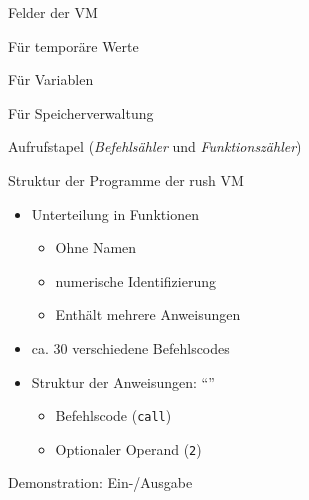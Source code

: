 \begin{frame}{Felder der VM}
	\begin{description}
		\item<1->[stack] Für temporäre Werte
		\item<2->[mem] Für Variablen
		\item<2->[mem\_ptr] Für Speicherverwaltung
		\item<3->[call\_stack] Aufrufstapel (\emph{Befehlsähler} und \emph{Funktionszähler})
	\end{description}
\end{frame}

\begin{frame}{Struktur der Programme der rush VM}
	\begin{itemize}
		\item<1-> Unterteilung in Funktionen
		      \begin{itemize}
			      \item Ohne Namen
			      \item numerische Identifizierung
			      \item Enthält mehrere Anweisungen
		      \end{itemize}
		\item<2-> ca. 30 verschiedene Befehlscodes
		\item<3-> Struktur der Anweisungen: \enquote{}
		      \begin{itemize}
			      \item<3-> Befehlscode (\texttt{call})
			      \item<3-> Optionaler Operand (\texttt{2})
		      \end{itemize}
	\end{itemize}
\end{frame}

\begin{frame}{Demonstration: Ein-/Ausgabe}
	\begin{minipage}{0.5\textwidth}
		\centering
	\end{minipage}
	\hfill
	\begin{minipage}{0.35\textwidth}
	\end{minipage}
\end{frame}

